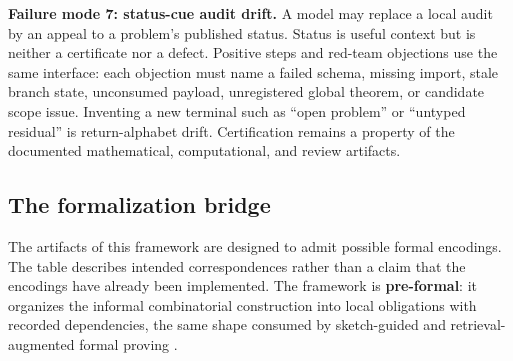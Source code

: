 \documentclass[
  11pt,
]{article}
\theoremstyle{definition}
\begin{document}
\textbf{Failure mode 7: status-cue audit drift.} A model may replace a
local audit by an appeal to a problem's published status. Status is
useful context but is neither a certificate nor a defect. Positive steps
and red-team objections use the same interface: each objection must name
a failed schema, missing import, stale branch state, unconsumed payload,
unregistered global theorem, or candidate scope issue. Inventing a new
terminal such as ``open problem'' or ``untyped residual'' is return-alphabet
drift. Certification remains a property of the documented mathematical,
computational, and review artifacts.

\subsection{The formalization
bridge}\label{the-formalization-bridge}

The artifacts of this framework are designed to admit possible formal
encodings. The table describes intended correspondences rather than a
claim that the encodings have already been implemented. The framework is
\textbf{pre-formal}: it organizes the informal combinatorial construction
into local obligations with recorded dependencies, the same shape
consumed by sketch-guided and retrieval-augmented formal proving
\citep{wu-etal-2022-autoformalization, jiang-etal-2022-draft-sketch-prove, yang-etal-2023-leandojo}.
\end{document}
